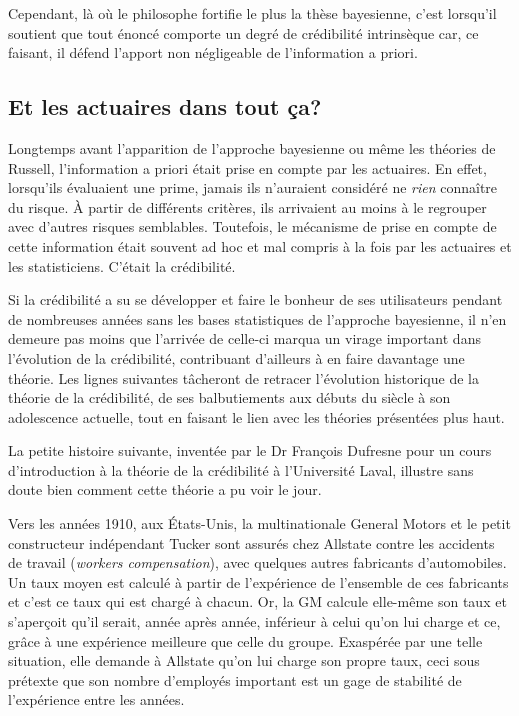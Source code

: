 Cependant, là où le philosophe fortifie le plus la thèse bayesienne,
c'est lorsqu'il soutient que tout énoncé comporte un degré de
crédibilité intrinsèque car, ce faisant, il défend l'apport non
négligeable de l'information a priori.

\subsection{Et les actuaires dans tout ça?}

Longtemps avant l'apparition de l'approche bayesienne ou même les
théories de Russell, l'information a priori était prise en compte par
les actuaires. En effet, lorsqu'ils évaluaient une prime, jamais ils
n'auraient considéré ne \emph{rien} connaître du risque. À partir de
différents critères, ils arrivaient au moins à le regrouper avec
d'autres risques semblables. Toutefois, le mécanisme de prise en
compte de cette information était souvent ad hoc et mal compris à
la fois par les actuaires et les statisticiens. C'était la
crédibilité.

Si la crédibilité a su se développer et faire le bonheur de ses
utilisateurs pendant de nombreuses années sans les bases statistiques
de l'approche bayesienne, il n'en demeure pas moins que l'arrivée de
celle-ci marqua un virage important dans l'évolution de la
crédibilité, contribuant d'ailleurs à en faire davantage une théorie.
Les lignes suivantes tâcheront de retracer l'évolution historique de
la théorie de la crédibilité, de ses balbutiements aux débuts du
siècle à son adolescence actuelle, tout en faisant le lien avec les
théories présentées plus haut.

La petite histoire suivante, inventée par le Dr François Dufresne pour
un cours d'introduction à la théorie de la crédibilité à l'Université
Laval, illustre sans doute bien comment cette théorie a pu voir le
jour.

Vers les années 1910, aux États-Unis, la multinationale General Motors
et le petit constructeur indépendant Tucker sont assurés chez Allstate
contre les accidents de travail (\emph{workers compensation}), avec
quelques autres fabricants d'automobiles. Un taux moyen est calculé à
partir de l'expérience de l'ensemble de ces fabricants et c'est ce
taux qui est chargé à chacun. Or, la GM calcule elle-même son taux et
s'aperçoit qu'il serait, année après année, inférieur à celui qu'on
lui charge et ce, grâce à une expérience meilleure que celle du
groupe. Exaspérée par une telle situation, elle demande à Allstate
qu'on lui charge son propre taux, ceci sous prétexte que son nombre
d'employés important est un gage de stabilité de l'expérience entre
les années.

